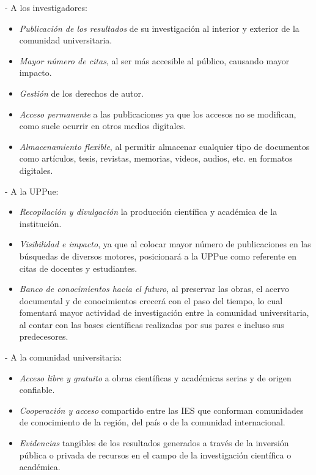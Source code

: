 - A los investigadores: 
	\begin{itemize}
	\item \textit{Publicaci\'on de los resultados} de su investigaci\'on al interior y exterior de la comunidad universitaria.
    \item \textit{Mayor n\'umero de citas}, al ser m\'as accesible al p\'ublico, causando mayor impacto.
    \item \textit{Gesti\'on} de los derechos de autor.
    \item \textit{Acceso permanente} a las publicaciones ya que los accesos no se modifican, como suele ocurrir en otros medios digitales.
    \item \textit{Almacenamiento flexible}, al permitir almacenar cualquier tipo de documentos como art\'iculos, tesis, revistas, memorias, videos, audios, etc. en formatos digitales.
	\end{itemize}
	
- A la UPPue:
	\begin{itemize}
	\item \textit{Recopilaci\'on y divulgaci\'on} la producci\'on cient\'ifica y acad\'emica de la instituci\'on.
    \item \textit{Visibilidad e impacto}, ya que al colocar mayor n\'umero de publicaciones en las b\'usquedas de diversos motores, posicionar\'a a la UPPue como referente en citas de docentes y estudiantes.
    \item \textit{Banco de conocimientos hacia el futuro}, al preservar las obras, el acervo do\-cu\-mental y de conocimientos crecer\'a con el paso del tiempo, lo cual fomentar\'a mayor actividad de investigaci\'on entre la comunidad universitaria, al contar con las bases cient\'ificas realizadas por sus pares e incluso sus predecesores.
	\end{itemize}
	
- A la comunidad universitaria:
  \begin{itemize}
  \item \textit{Acceso libre y gratuito} a obras cient\'ificas y acad\'emicas serias y de origen confiable.
  \item \textit{Cooperaci\'on y acceso} compartido entre las IES que conforman comunidades de conocimiento de la regi\'on, del pa\'is o de la comunidad internacional.
  \item \textit{Evidencias} tangibles de los resultados generados a trav\'es de la inversi\'on p\'ublica o privada de recursos en el campo de la investigaci\'on cient\'ifica o acad\'emica.
  \end{itemize}

